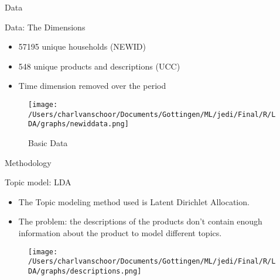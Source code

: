 \documentclass{beamer}
\begin{document}
\begin{frame}{Data}
\begin{block}{Data: The Dimensions}
\begin{itemize}
\item 57195 unique households (NEWID)
\item 548 unique products and descriptions (UCC)
\item Time dimension removed over the period
\end{itemize}
\begin{figure}
\texttt{[image: /Users/charlvanschoor/Documents/Gottingen/ML/jedi/Final/R/LDA/graphs/newiddata.png]}
\caption{\label{fig:your-figure}Basic Data}
\end{figure}
\end{block}
\end{frame}










\begin{frame}{Methodology}
\begin{block}{Topic model: LDA}
\begin{itemize}
\item The Topic modeling method used is Latent Dirichlet Allocation. 
\item The problem: the descriptions of the products don't contain enough information about the product to model different topics.
\end{itemize}
\begin{figure}
\texttt{[image: /Users/charlvanschoor/Documents/Gottingen/ML/jedi/Final/R/LDA/graphs/descriptions.png]}
\end{figure}
\end{block}
\end{frame}
\end{document}

